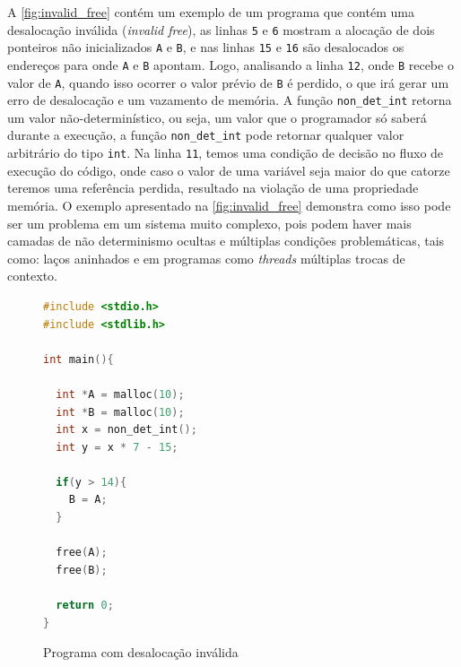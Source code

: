 A \autoref{fig:invalid_free} contém um exemplo de um programa que contém uma desalocação inválida (\textit{invalid free}), as linhas \texttt{5} e \texttt{6} mostram a alocação de dois ponteiros não inicializados \texttt{A} e \texttt{B}, e nas linhas \texttt{15} e \texttt{16} são desalocados os endereços para onde \texttt{A} e \texttt{B} apontam. Logo, analisando a linha \texttt{12}, onde \texttt{B} recebe o valor de \texttt{A}, quando isso ocorrer o valor prévio de \texttt{B} é perdido, o que irá gerar um erro de desalocação e um vazamento de memória. A função \texttt{non\_det\_int} retorna um valor não-determinístico, ou seja, um valor que o programador só saberá durante a execução, a função \texttt{non\_det\_int} pode retornar qualquer valor arbitrário do tipo \texttt{int}. Na linha \texttt{11}, temos uma condição de decisão no fluxo de execução do código, onde caso o valor de uma variável seja maior do que catorze teremos uma referência perdida, resultado na violação de uma propriedade memória.
O exemplo apresentado na \autoref{fig:invalid_free} demonstra como isso pode ser um problema em um sistema muito complexo, pois podem haver mais camadas de não determinismo ocultas e múltiplas condições problemáticas, tais como: laços aninhados e em programas como \textit{threads} múltiplas trocas de contexto.  

\begin{figure}[thp]
\caption{\label{fig:invalid_free} Programa com desalocação inválida}
\begin{center}
\begin{minipage}{0.8\textwidth}
\begin{lstlisting}[language=C]       
#include <stdio.h>
#include <stdlib.h>

int main(){

  int *A = malloc(10);
  int *B = malloc(10); 
  int x = non_det_int();
  int y = x * 7 - 15;
  
  if(y > 14){
    B = A;           
  }
  
  free(A);  
  free(B);            

  return 0;
}	
\end{lstlisting}
\end{minipage}
\end{center}
\end{figure}


